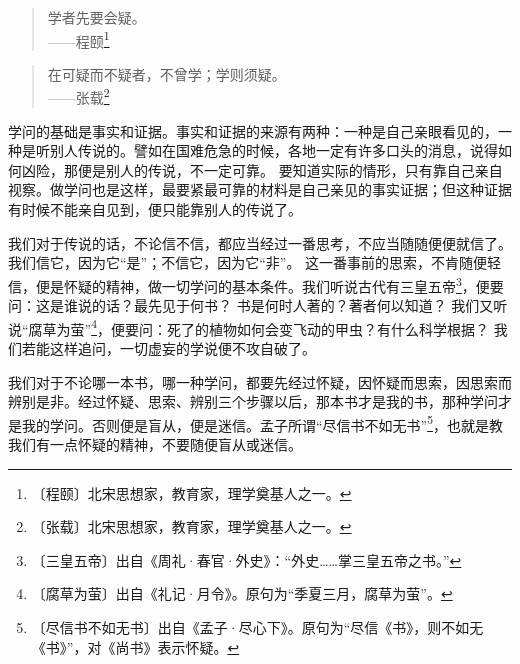 \documentclass[12pt,UTF-8,openany]{ctexbook}
\begin{document}
\begin{normalsize}
    
    \begin{quotation}
    
    学者先要会疑。\\
    
    \hfill ——程颐\footnote{〔程颐〕北宋思想家，教育家，理学奠基人之一。}
    
    \end{quotation}
    
    \begin{quotation}
    
    在可疑而不疑者，不曾学；学则须疑。\\
    
    \hfill ——张载\footnote{〔张载〕北宋思想家，教育家，理学奠基人之一。}
    
    \end{quotation}
    
    学问的基础是事实和证据。事实和证据的来源有两种：一种是自己亲眼看见的，一种是听别人传说的。譬如在国难危急的时候，各地一定有许多口头的消息，说得如何凶险，那便是别人的传说，不一定可靠。 要知道实际的情形，只有靠自己亲自视察。做学问也是这样，最要紧最可靠的材料是自己亲见的事实证据；但这种证据有时候不能亲自见到，便只能靠别人的传说了。
    
    我们对于传说的话，不论信不信，都应当经过一番思考，不应当随随便便就信了。我们信它，因为它“是”；不信它，因为它“非”。 这一番事前的思索，不肯随便轻信，便是怀疑的精神，做一切学问的基本条件。我们听说古代有三皇五帝\footnote{〔三皇五帝〕出自《周礼·春官·外史》：“外史……掌三皇五帝之书。”}，便要问：这是谁说的话？最先见于何书？ 书是何时人著的？著者何以知道？ 我们又听说“腐草为萤”\footnote{〔腐草为萤〕出自《礼记·月令》。原句为“季夏三月，腐草为萤”。}，便要问：死了的植物如何会变飞动的甲虫？有什么科学根据？ 我们若能这样追问，一切虚妄的学说便不攻自破了。
    
    我们对于不论哪一本书，哪一种学问，都要先经过怀疑，因怀疑而思索，因思索而辨别是非。经过怀疑、思索、辨别三个步骤以后，那本书才是我的书，那种学问才是我的学问。否则便是盲从，便是迷信。孟子所谓“尽信书不如无书”\footnote{〔尽信书不如无书〕出自《孟子·尽心下》。原句为“尽信《书》，则不如无《书》”，对《尚书》表示怀疑。}，也就是教我们有一点怀疑的精神，不要随便盲从或迷信。
    

\end{normalsize}
\end{document}
